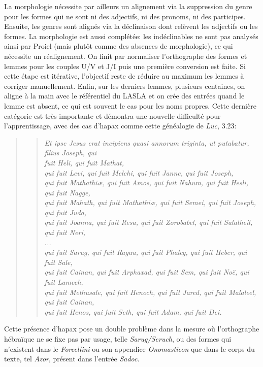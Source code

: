 La morphologie nécessite par ailleurs un alignement via la suppression du genre pour les formes qui ne sont ni des adjectifs, ni des pronoms, ni des participes. Ensuite, les genres sont alignés via la déclinaison dont relèvent les adjectifs ou les formes. La morphologie est aussi complétée: les indéclinables ne sont pas analysés ainsi par Proiel (mais plutôt comme des absences de morphologie), ce qui nécessite un réalignement. On finit par normaliser l'orthographe des formes et lemmes pour les couples U/V et J/I puis une première conversion est faite. Si cette étape est itérative, l'objectif reste de réduire au maximum les lemmes à corriger manuellement. Enfin, sur les derniers lemmes, plusieurs centaines, on aligne à la main avec le référentiel du LASLA et on crée des entrées quand le lemme est absent, ce qui est souvent le cas pour les noms propres. Cette dernière catégorie est très importante et démontra une nouvelle difficulté pour l'apprentissage, avec des cas d'hapax comme cette généalogie de \textit{Luc}, 3.23:

\begin{quote}
\blockquote{\textit{Et ipse Jesus erat incipiens quasi annorum triginta, ut putabatur, filius Joseph, qui  \\fuit Heli, qui fuit Mathat, \\
qui fuit Levi, qui fuit Melchi, qui fuit Janne, qui fuit Joseph, \\
qui fuit Mathathiæ, qui fuit Amos, qui fuit Nahum, qui fuit Hesli, qui fuit Nagge, \\
qui fuit Mahath, qui fuit Mathathiæ, qui fuit Semei, qui fuit Joseph, qui fuit Juda, \\
qui fuit Joanna, qui fuit Resa, qui fuit Zorobabel, qui fuit Salatheil, qui fuit Neri, \\
\textit{...} \\
qui fuit Sarug, qui fuit Ragau, qui fuit Phaleg, qui fuit Heber, qui fuit Sale, \\
qui fuit Cainan, qui fuit Arphaxad, qui fuit Sem, qui fuit Noë, qui fuit Lamech, \\
qui fuit Methusale, qui fuit Henoch, qui fuit Jared, qui fuit Malaleel, qui fuit Cainan, \\
qui fuit Henos, qui fuit Seth, qui fuit Adam, qui fuit Dei.}}
\end{quote}

Cette présence d'hapax pose un double problème dans la mesure où l'orthographe hébraïque ne se fixe pas par usage, telle \textit{Sarug/Seruch}, ou des formes qui n'existent dans le \textit{Forcellini} ou son appendice \textit{Onomasticon} que dans le corps du texte, tel \textit{Azor}, présent dans l'entrée \textit{Sadoc}.

